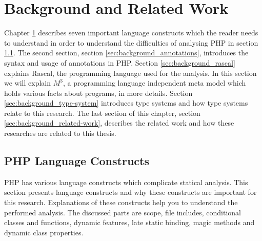 \documentclass[../main.tex]{subfiles}
\begin{document}
    \chapter{Background and Related Work}\label{ch:background}
    Chapter \ref{ch:background} describes seven important language constructs which the reader needs to understand in order to understand the difficulties of analysing PHP in section \ref{sec:background_language-constructs}.
    The second section, section \ref{sec:background_annotations}, introduces the syntax and usage of annotations in PHP.
    Section \ref{sec:background_rascal} explains \Gls{Rascal}, the programming language used for the analysis.
    In this section we will explain $M^3$, a programming language independent meta model which holds various facts about programs, in more details.
    Section \ref{sec:background_type-system} introduces type systems and how type systems relate to this research.
    The last section of this chapter, section \ref{sec:background_related-work}, describes the related work and how these researches are related to this thesis.

    \section{PHP Language Constructs}\label{sec:background_language-constructs}
    PHP has various language constructs which complicate statical analysis. 
    This section presents language constructs and why these constructs are important for this research.
    Explanations of these constructs help you to understand the performed analysis.
    The discussed parts are scope, file includes, conditional classes and functions, dynamic features, late static binding, magic methods and dynamic class properties.
    
\end{document}
